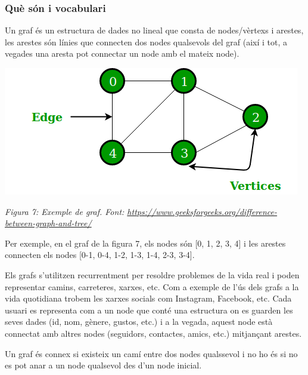 \subsubsection{Què són i vocabulari}

Un graf és un estructura de dades no lineal que consta de nodes/vèrtexs i arestes, les arestes són línies que connecten dos nodes qualsevols del graf (així i tot, a vegades una aresta pot connectar un node amb el mateix node). \newline

\begin{center}
    \includegraphics[width =.8 \textwidth]{graf.png}

    \caption{\emph{Figura 7: Exemple de graf. Font: \url{https://www.geeksforgeeks.org/difference-between-graph-and-tree/}}}
\end{center}

Per exemple, en el graf de la figura 7, els nodes són [0, 1, 2, 3, 4] i les arestes connecten els nodes [0-1, 0-4, 1-2, 1-3, 1-4, 2-3, 3-4]. \newline

Els grafs s'utilitzen recurrentment per resoldre problemes de la vida real i poden representar camins, carreteres, xarxes, etc.
Com a exemple de l'ús dels grafs a la vida quotidiana trobem les xarxes socials com Instagram, Facebook, etc. Cada usuari es representa com a un node que conté una estructura on es guarden les seves dades (id, nom, gènere, gustos, etc.) i a la vegada, aquest node està connectat amb altres nodes (seguidors, contactes, amics, etc.) mitjançant arestes. \newline

Un graf és connex si existeix un camí entre dos nodes qualssevol i no ho és si no es pot anar a un node qualsevol des d'un node inicial. \newline

